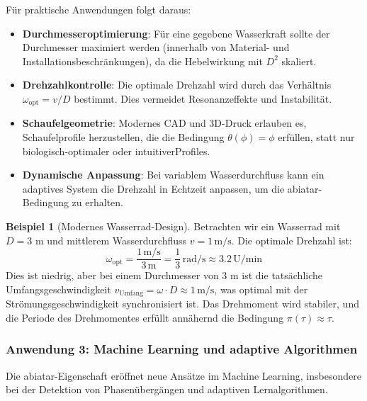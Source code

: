 \documentclass[a4paper,12pt]{article}
\theoremstyle{definition}
\newtheorem{beispiel}{Beispiel}
\begin{document}
Für praktische Anwendungen folgt daraus:

\begin{itemize}
	\item \textbf{Durchmesseroptimierung}: Für eine gegebene Wasserkraft sollte der Durchmesser maximiert werden (innerhalb von Material- und Installationsbeschränkungen), da die Hebelwirkung mit $D^2$ skaliert.
	
	\item \textbf{Drehzahlkontrolle}: Die optimale Drehzahl wird durch das Verhältnis $\omega_{\text{opt}} = v / D$ bestimmt. Dies vermeidet Resonanzeffekte und Instabilität.
	
	\item \textbf{Schaufelgeometrie}: Modernes CAD und 3D-Druck erlauben es, Schaufelprofile herzustellen, die die Bedingung $\theta(\phi) = \phi$ erfüllen, statt nur biologisch-optimaler oder intuitiverProfiles.
	
	\item \textbf{Dynamische Anpassung}: Bei variablem Wasserdurchfluss kann ein adaptives System die Drehzahl in Echtzeit anpassen, um die abiatar-Bedingung zu erhalten.
\end{itemize}

\begin{beispiel}[Modernes Wasserrad-Design]
Betrachten wir ein Wasserrad mit $D = 3$ m und mittlerem Wasserdurchfluss $v = 1\,\text{m/s}$. Die optimale Drehzahl ist:
\begin{equation}
\omega_{\text{opt}} = \frac{1\,\text{m/s}}{3\,\text{m}} = \frac{1}{3}\,\text{rad/s} \approx 3.2\,\text{U/min}
\end{equation}
Dies ist niedrig, aber bei einem Durchmesser von 3 m ist die tatsächliche Umfangsgeschwindigkeit $v_{\text{Umfang}} = \omega \cdot D \approx 1\,\text{m/s}$, was optimal mit der Strömungsgeschwindigkeit synchronisiert ist. Das Drehmoment wird stabiler, und die Periode des Drehmomentes erfüllt annähernd die Bedingung $\pi(\tau) \approx \tau$.
\end{beispiel}

\subsubsection{Anwendung 3: Machine Learning und adaptive Algorithmen}

Die abiatar-Eigenschaft eröffnet neue Ansätze im Machine Learning, insbesondere bei der Detektion von Phasenübergängen und adaptiven Lernalgorithmen.
\end{document}

